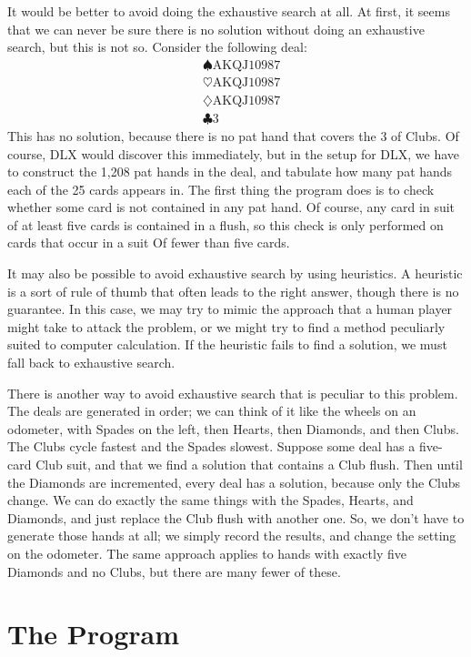 \documentclass [12pt, letterpaper] {article}
\begin{document}
It would be better to avoid doing the exhaustive search at all.  At first, it seems that we can never be sure there is no 
solution without doing an exhaustive search, but this is not so.  Consider the following deal:
\begin{align*}
    &\spadesuit \text{AKQJ10987} \\
    &\heartsuit \text{AKQJ10987}  \\
    &\diamondsuit \text{AKQJ10987} \\
    &\clubsuit \text{3}
\end{align*}
This has no solution, because there is no pat hand that covers the 3 of Clubs.  Of course, DLX would discover this immediately, but in the 
setup for DLX, we have to construct the 1,208 pat hands in the deal, and tabulate how many pat hands each of the 25 cards
appears in.  The first thing the program does is to check whether some card is not contained in any pat hand.  Of course, any
card in suit of at least five cards is contained in a flush, so this check is only performed on cards that occur in a suit Of
fewer than five cards.

It may also be possible to avoid exhaustive search by using heuristics.  A heuristic is a sort of rule of thumb that often leads 
to the right answer, though there is no guarantee.  In this case, we may try to mimic the approach that a human player might take
to attack the problem, or we might try to find a method peculiarly suited to computer calculation.  If the heuristic fails to find 
a solution, we must fall back to exhaustive search.

There is another way to avoid exhaustive search that is peculiar to this problem.  The deals are generated in order; we can
think of it like the wheels on an odometer, with Spades on the left, then Hearts, then Diamonds, and then Clubs.  The Clubs cycle
fastest and the Spades slowest.  Suppose some deal has a five-card Club suit, and that we find a solution that contains a
Club flush.  Then until the Diamonds are incremented, every deal has a solution, because only the Clubs change.  We can do
exactly the same things with the Spades, Hearts, and Diamonds, and just replace the Club flush with another one.  So, we don't
have to generate those hands at all; we simply record the results, and change the setting on the odometer.  The same approach
applies to hands with exactly five Diamonds and no Clubs, but there are many fewer of these.

\section*{The Program}
\end{document}
